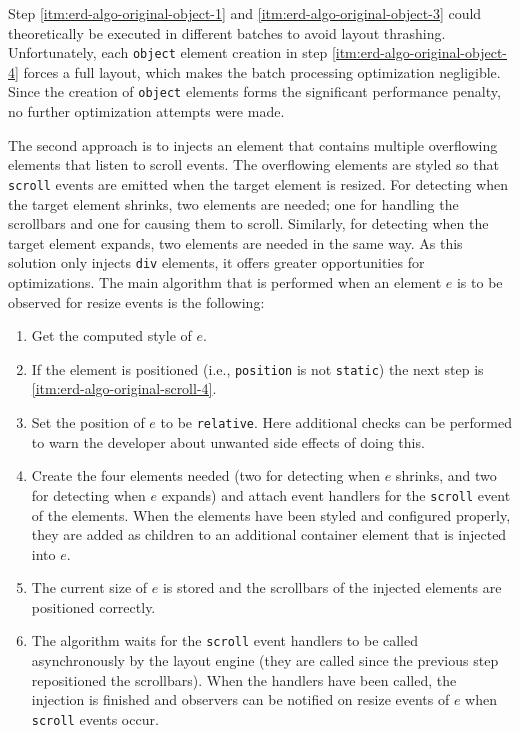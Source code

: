 \documentclass{acm_proc_article-sp}
\newcommand{\code}[1]{\texttt{#1}}
\newcommand{\gls}[1]{#1}
\begin{document}
    Step \ref{itm:erd-algo-original-object-1} and \ref{itm:erd-algo-original-object-3} could theoretically be executed in different batches to avoid \gls{layout thrashing}.
    Unfortunately, each \code{object} element creation in step \ref{itm:erd-algo-original-object-4} forces a full layout, which makes the batch processing optimization negligible.
    Since the creation of \code{object} elements forms the significant performance penalty, no further optimization attempts were made.

    The second approach is to injects an \gls{element} that contains multiple overflowing elements that listen to scroll events.
    The overflowing elements are styled so that \code{scroll} events are emitted when the target \gls{element} is resized.
    For detecting when the target \gls{element} shrinks, two elements are needed; one for handling the scrollbars and one for causing them to scroll.
    Similarly, for detecting when the target \gls{element} expands, two elements are needed in the same way.
    As this solution only injects \code{div} elements, it offers greater opportunities for optimizations.
    The main algorithm that is performed when an element $e$ is to be observed for resize events is the following:
    \begin{enumerate}
      \item\label{itm:erd-algo-original-scroll-1} Get the computed style of $e$.
      \item\label{itm:erd-algo-original-scroll-2} If the element is positioned (i.e., \code{position} is not \code{static}) the next step is \ref{itm:erd-algo-original-scroll-4}.
      \item\label{itm:erd-algo-original-scroll-3} Set the position of $e$ to be \code{relative}. Here additional checks can be performed to warn the developer about unwanted side effects of doing this.
      \item\label{itm:erd-algo-original-scroll-4} Create the four elements needed (two for detecting when $e$ shrinks, and two for detecting when $e$ expands) and attach event handlers for the \code{scroll} event of the elements.
                                                  When the elements have been styled and configured properly, they are added as children to an additional container element that is injected into $e$.
      \item\label{itm:erd-algo-original-scroll-5} The current size of $e$ is stored and the scrollbars of the injected elements are positioned correctly.
      \item\label{itm:erd-algo-original-scroll-6} The algorithm waits for the \code{scroll} event handlers to be called asynchronously by the \gls{layout engine} (they are called since the previous step repositioned the scrollbars).
                                                  When the handlers have been called, the injection is finished and observers can be notified on resize events of $e$ when \code{scroll} events occur.
    \end{enumerate}
\end{document}
